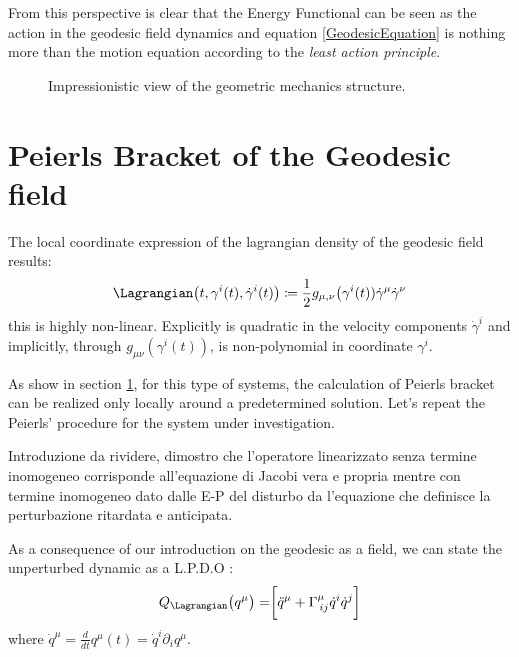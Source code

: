 \documentclass[Main]{subfiles}
\begin{document}
	From this perspective is clear that the Energy Functional can be seen as the action in the geodesic field dynamics and equation \ref{GeodesicEquation} is nothing more than the motion equation according to the \emph{least action principle}.

		\begin{figure}[h!]
				  \centering
   	  \caption{Impressionistic view of the geometric mechanics structure.}
		\end{figure}		


\section{Peierls Bracket of the Geodesic field}
	The local coordinate expression of the lagrangian density of the geodesic field results:
	\begin{equation}
		\Lagrangian\big(t,\gamma^i(t), \dot{\gamma}^i(t) \big)\coloneqq \frac{1}{2}g_{\mu,\nu}\big(\gamma^i(t))\dot{\gamma}^\mu \dot{\gamma}^\nu
	\end{equation}		
	this is highly non-linear. Explicitly is quadratic in the velocity components $\dot{\gamma}^i$ and implicitly, through $g_{\mu\nu}(\gamma^i(t))$, is non-polynomial in coordinate $\gamma^i$.
	
	As show in section \ref{}, for this type of systems, the calculation of Peierls bracket can be realized only locally around a predetermined solution.
	Let's repeat the Peierls' procedure for the system under investigation.
	
	\begin{Warning}
	Introduzione da rividere, dimostro che l'operatore linearizzato senza termine inomogeneo corrisponde all'equazione di Jacobi vera e propria mentre con termine inomogeneo dato dalle E-P del disturbo da l'equazione che definisce la perturbazione ritardata e anticipata.
	\end{Warning}

	As a consequence of our introduction on the geodesic as a field, we can state the unperturbed dynamic as a L.P.D.O :
		\begin{equation}
			Q_\Lagrangian \big(q^\mu 	\big)= \biggr[\ddot{q}^\mu + \Gamma^\mu_{\, i j}\dot{q}^i \dot{q}^j	\biggr]
		\end{equation}
	where $\dot{q}^\mu = \frac{d}{dt}q^\mu(t)=\dot{q}^i\partial_i q^\mu$.
	
\end{document}
